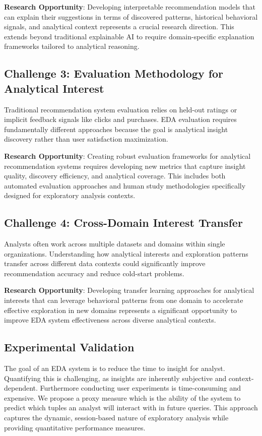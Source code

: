 \documentclass[sigconf, nonacm]{acmart}
\begin{document}
\textbf{Research Opportunity}: Developing interpretable recommendation models that can explain their suggestions in terms of discovered patterns, historical behavioral signals, and analytical context represents a crucial research direction. This extends beyond traditional explainable AI to require domain-specific explanation frameworks tailored to analytical reasoning.

\subsection{Challenge 3: Evaluation Methodology for Analytical Interest}

Traditional recommendation system evaluation relies on held-out ratings or implicit feedback signals like clicks and purchases. EDA evaluation requires fundamentally different approaches because the goal is analytical insight discovery rather than user satisfaction maximization.

\textbf{Research Opportunity}: Creating robust evaluation frameworks for analytical recommendation systems requires developing new metrics that capture insight quality, discovery efficiency, and analytical coverage. This includes both automated evaluation approaches and human study methodologies specifically designed for exploratory analysis contexts.

\subsection{Challenge 4: Cross-Domain Interest Transfer}

Analysts often work across multiple datasets and domains within single organizations. Understanding how analytical interests and exploration patterns transfer across different data contexts could significantly improve recommendation accuracy and reduce cold-start problems.

\textbf{Research Opportunity}: Developing transfer learning approaches for analytical interests that can leverage behavioral patterns from one domain to accelerate effective exploration in new domains represents a significant opportunity to improve EDA system effectiveness across diverse analytical contexts.


\subsection{Experimental Validation}

The goal of an EDA system is to reduce the time to insight for analyst. Quantifying this is challenging, as insights are inherently subjective and context-dependent. Furthermore conducting user experiments is time-consuming and expensive. We propose a proxy measure which is the ability of the system to predict which tuples an analyst will interact with in future queries. This approach captures the dynamic, session-based nature of exploratory analysis while providing quantitative performance measures. 
\end{document}
